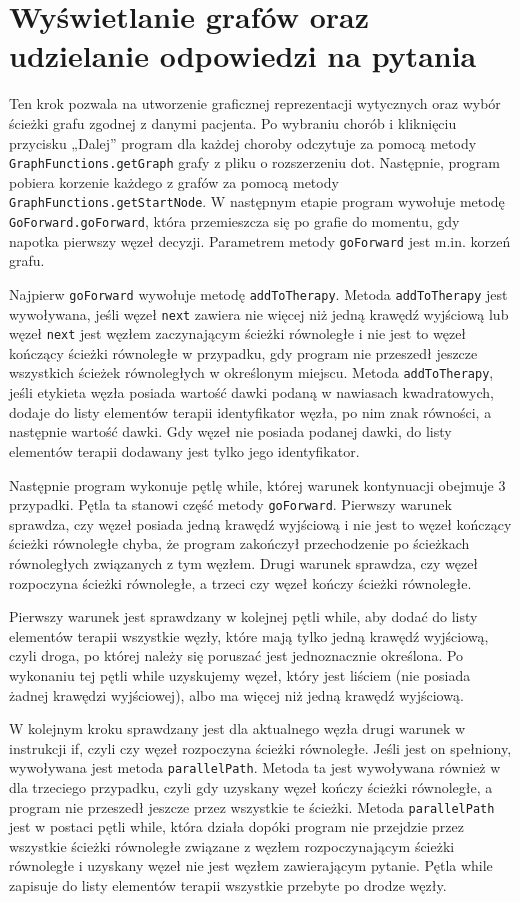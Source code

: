\section{Wyświetlanie grafów oraz udzielanie odpowiedzi na pytania}
Ten krok pozwala na utworzenie graficznej reprezentacji wytycznych oraz wybór ścieżki grafu zgodnej z danymi pacjenta. Po wybraniu chorób i kliknięciu przycisku „Dalej” program dla każdej choroby odczytuje za pomocą metody \texttt{GraphFunctions.getGraph} grafy z pliku o rozszerzeniu dot. Następnie, program pobiera korzenie każdego z grafów za pomocą metody \texttt{GraphFunctions.get\-StartNode}. W następnym etapie program wywołuje metodę \texttt{GoForward.goForward}, która przemieszcza się po grafie do momentu, gdy napotka pierwszy węzeł decyzji. Parametrem metody \texttt{goForward} jest m.in. korzeń grafu.

Najpierw \texttt{goForward} wywołuje metodę \texttt{addToTherapy}. Metoda \texttt{addToTherapy} jest wywoływana, jeśli węzeł \texttt{next} zawiera nie więcej niż jedną krawędź wyjściową lub węzeł \texttt{next} jest węzłem zaczynającym ścieżki równoległe i nie jest to węzeł kończący ścieżki równoległe w przypadku, gdy program nie przeszedł jeszcze wszystkich ścieżek równoległych w określonym miejscu. Metoda \texttt{addToTherapy}, jeśli etykieta węzła posiada wartość dawki podaną w nawiasach kwadratowych, dodaje do listy elementów terapii identyfikator węzła, po nim znak równości, a następnie wartość dawki. Gdy węzeł nie posiada podanej dawki, do listy elementów terapii dodawany jest tylko jego identyfikator. 

Następnie program wykonuje pętlę while, której warunek kontynuacji obejmuje 3 przypadki. Pętla ta stanowi część metody \texttt{goForward}. Pierwszy warunek sprawdza, czy węzeł posiada jedną krawędź wyjściową i nie jest to węzeł kończący ścieżki równoległe chyba, że program zakończył przechodzenie po ścieżkach równoległych związanych z tym węzłem. Drugi warunek sprawdza, czy węzeł rozpoczyna ścieżki równoległe, a trzeci czy węzeł kończy ścieżki równoległe. 

Pierwszy warunek jest sprawdzany w kolejnej pętli while, aby dodać do listy elementów terapii wszystkie węzły, które mają tylko jedną krawędź wyjściową, czyli droga, po której należy się poruszać jest jednoznacznie określona. 
Po wykonaniu tej pętli while uzyskujemy węzeł, który jest liściem (nie posiada żadnej krawędzi wyjściowej), albo ma więcej niż jedną krawędź wyjściową.

W kolejnym kroku sprawdzany jest dla aktualnego węzła drugi warunek w instrukcji if, czyli czy węzeł rozpoczyna ścieżki równoległe. Jeśli jest on spełniony, wywoływana jest metoda \texttt{parallel\-Path}. Metoda ta jest wywoływana również w dla trzeciego przypadku, czyli gdy uzyskany węzeł kończy ścieżki równoległe, a program nie przeszedł jeszcze przez wszystkie te ścieżki. Metoda \texttt{parallel\-Path} jest w postaci pętli while, która działa dopóki program nie przejdzie przez wszystkie ścieżki równoległe związane z węzłem rozpoczynającym ścieżki równoległe i uzyskany węzeł nie jest węzłem zawierającym pytanie. Pętla while zapisuje do listy elementów terapii wszystkie przebyte po drodze węzły.  


